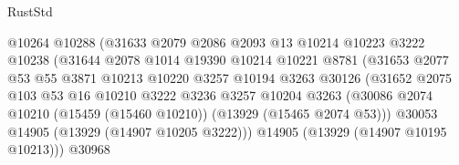 \begin{lexlean}{RustStd}
\begin{coremodule}
                                      @10264
                                      @10288
                                      (@31633
                                        @2079
                                        @2086
                                        @2093
                                        @13
                                        @10214
                                        @10223
                                        @3222
                                        @10238
                                        (@31644
                                          @2078
                                          @1014
                                          @19390
                                          @10214
                                          @10221
                                          @8781
                                          (@31653
                                            @2077
                                            @53
                                            @55
                                            @3871
                                            @10213
                                            @10220
                                            @3257
                                            @10194
                                            @3263
                                            @30126
                                            (@31652
                                              @2075
                                              @103
                                              @53
                                              @16
                                              @10210
                                              @3222
                                              @3236
                                              @3257
                                              @10204
                                              @3263
                                              (@30086
                                                @2074
                                                @10210
                                                (@15459 (@15460 @10210))
                                                (@13929 (@15465 @2074 @53)))
                                              @30053
                                              @14905
                                              (@13929 (@14907 @10205 @3222)))
                                            @14905
                                            (@13929 (@14907 @10195 @10213)))
                                          @30968

\end{coremodule}
\end{lexlean}
